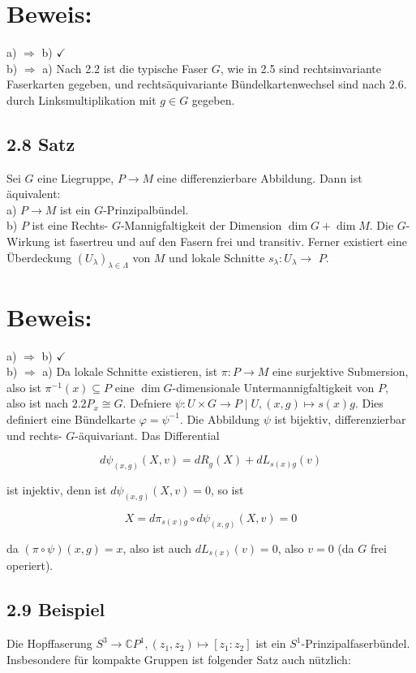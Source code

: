 \section*{Beweis:}
a) $\Rightarrow$ b) $\checkmark$\\
b) $\Rightarrow$ a) Nach 2.2 ist die typische Faser $G$, wie in 2.5 sind rechtsinvariante Faserkarten gegeben, und rechtsäquivariante Bündelkartenwechsel sind nach 2.6. durch Linksmultiplikation mit $g \in G$ gegeben.

\subsection*{2.8 Satz}
Sei $G$ eine Liegruppe, $P \rightarrow M$ eine differenzierbare Abbildung. Dann ist äquivalent:\\
a) $P \rightarrow M$ ist ein $G$-Prinzipalbündel.\\
b) $P$ ist eine Rechts- $G$-Mannigfaltigkeit der Dimension $\operatorname{dim} G+\operatorname{dim} M$. Die $G$-Wirkung ist fasertreu und auf den Fasern frei und transitiv. Ferner existiert eine Überdeckung $\left(U_{\lambda}\right)_{\lambda \in \Lambda}$ von $M$ und lokale Schnitte $s_{\lambda}: U_{\lambda} \rightarrow$ $P$.

\section*{Beweis:}
a) $\Rightarrow$ b) $\checkmark$\\
b) $\Rightarrow$ a) Da lokale Schnitte existieren, ist $\pi: P \rightarrow M$ eine surjektive Submersion, also ist $\pi^{-1}(x) \subseteq P$ eine $\operatorname{dim} G$-dimensionale Untermannigfaltigkeit von $P$,\\
also ist nach $2.2 P_{x} \cong G$. Defniere $\psi: U \times G \rightarrow P \mid U,(x, g) \mapsto s(x) g$. Dies definiert eine Bündelkarte $\varphi=\psi^{-1}$. Die Abbildung $\psi$ ist bijektiv, differenzierbar und rechts- $G$-äquivariant. Das Differential

$$
d \psi_{(x, g)}(X, v)=d R_{g}(X)+d L_{s(x) g}(v)
$$

ist injektiv, denn ist $d \psi_{(x, g)}(X, v)=0$, so ist

$$
X=d \pi_{s(x) g} \circ d \psi_{(x, g)}(X, v)=0
$$

da $(\pi \circ \psi)(x, g)=x$, also ist auch $d L_{s(x)}(v)=0$, also $v=0$ (da $G$ frei operiert).

\subsection*{2.9 Beispiel}
Die Hopffaserung $S^{3} \rightarrow \mathbb{C} P^{1},\left(z_{1}, z_{2}\right) \mapsto\left[z_{1}: z_{2}\right]$ ist ein $S^{1}$-Prinzipalfaserbündel.\\
Insbesondere für kompakte Gruppen ist folgender Satz auch nützlich:


